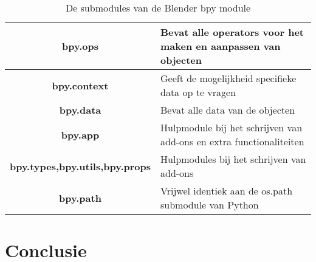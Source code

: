 \begin{table}[H]
\caption{De submodules van de Blender bpy module \citep*{API1}}
\begin{center}
\begin{tabular}{|c|l|}
\hline
\textbf{bpy.ops}                       & Bevat alle operators voor het maken en aanpassen van objecten       \\ \hline
\textbf{bpy.context}                   & Geeft de mogelijkheid specifieke data op te vragen                  \\ \hline
\textbf{bpy.data}                      & Bevat alle data van de objecten                                     \\ \hline
\textbf{bpy.app}                       & Hulpmodule bij het schrijven van add-ons en extra functionaliteiten \\ \hline
\textbf{bpy.types,bpy.utils,bpy.props} & Hulpmodules bij het schrijven van add-ons                           \\ \hline
\textbf{bpy.path}                      & Vrijwel identiek aan de os.path submodule van Python                \\ \hline
\end{tabular}
\end{center}
\end{table}


\section{Conclusie}

